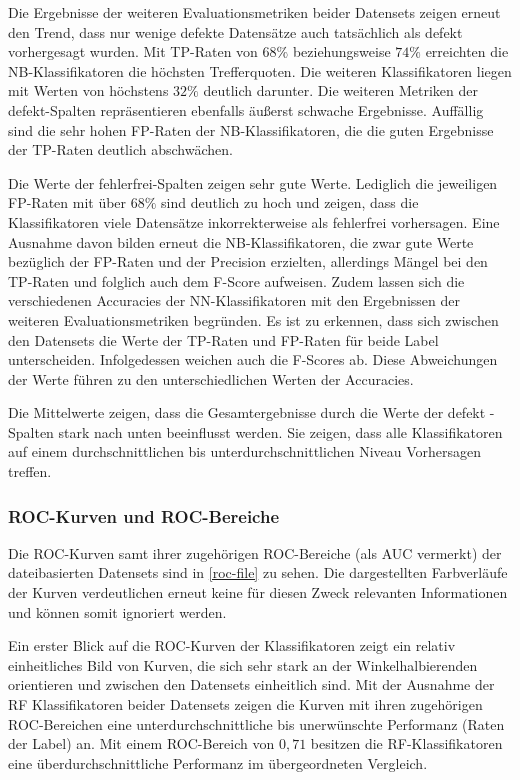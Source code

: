 Die Ergebnisse der weiteren Evaluationsmetriken beider Datensets zeigen erneut den Trend, dass nur wenige defekte Datensätze auch tatsächlich als defekt vorhergesagt wurden. Mit TP-Raten von $68\%$ beziehungsweise $74\%$ erreichten die NB-Klassifikatoren die höchsten Trefferquoten. Die weiteren Klassifikatoren liegen mit Werten von höchstens $32\%$ deutlich darunter. Die weiteren Metriken der \glqq defekt\grqq -Spalten repräsentieren ebenfalls äußerst schwache Ergebnisse. Auffällig sind die sehr hohen FP-Raten der NB-Klassifikatoren, die die guten Ergebnisse der TP-Raten deutlich abschwächen.

Die Werte der \glqq fehlerfrei\grqq -Spalten zeigen sehr gute Werte. Lediglich die jeweiligen FP-Raten mit über $68\%$ sind deutlich zu hoch und zeigen, dass die Klassifikatoren viele Datensätze inkorrekterweise als \glqq fehlerfrei\grqq{} vorhersagen. Eine Ausnahme davon bilden erneut die NB-Klassifikatoren, die zwar gute Werte bezüglich der FP-Raten und der Precision erzielten, allerdings Mängel bei den TP-Raten und folglich auch dem F-Score aufweisen. Zudem lassen sich die verschiedenen Accuracies der NN-Klassifikatoren mit den Ergebnissen der weiteren Evaluationsmetriken begründen. Es ist zu erkennen, dass sich zwischen den Datensets die Werte der TP-Raten und FP-Raten für beide Label unterscheiden. Infolgedessen weichen auch die F-Scores ab. Diese Abweichungen der Werte führen zu den unterschiedlichen Werten der Accuracies.

Die Mittelwerte zeigen, dass die Gesamtergebnisse durch die Werte der \glqq defekt\grqq{} -Spalten stark nach unten beeinflusst werden. Sie zeigen, dass alle Klassifikatoren auf einem durchschnittlichen bis unterdurchschnittlichen Niveau Vorhersagen treffen.

\subsubsection*{ROC-Kurven und ROC-Bereiche}

Die ROC-Kurven samt ihrer zugehörigen ROC-Bereiche (als \glqq AUC\grqq{} vermerkt) der dateibasierten Datensets sind in \autoref{roc-file} zu sehen. Die dargestellten Farbverläufe der Kurven verdeutlichen erneut keine für diesen Zweck relevanten Informationen und können somit ignoriert werden.

Ein erster Blick auf die ROC-Kurven der Klassifikatoren zeigt ein relativ einheitliches Bild von Kurven, die sich sehr stark an der Winkelhalbierenden orientieren und zwischen den Datensets einheitlich sind. Mit der Ausnahme der RF Klassifikatoren beider Datensets zeigen die Kurven mit ihren zugehörigen ROC-Bereichen eine unterdurchschnittliche bis unerwünschte Performanz (\glqq Raten\grqq{} der Label) an. Mit einem ROC-Bereich von $0,71$ besitzen die RF-Klassifikatoren eine überdurchschnittliche Performanz im übergeordneten Vergleich.

